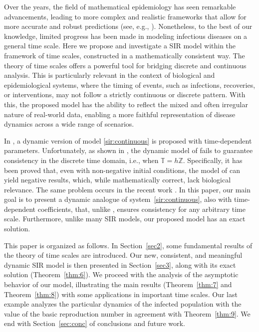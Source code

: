 \documentclass[pdflatex,sn-mathphys-num]{sn-jnl}
\theoremstyle{remark}
\begin{document}
Over the years, the field of mathematical epidemiology has seen remarkable advancements, leading 
to more complex and realistic frameworks that allow for more accurate and 
robust predictions (see, e.g., \cite{caetano, gai, lopez, influenza}). 
Nonetheless, to the best of our knowledge, limited progress has been made
in modeling infectious diseases on a general time scale. 
Here we propose and investigate a SIR model within the framework of time scales, 
constructed in a mathematically consistent way. The theory of time scales offers 
a powerful tool for bridging discrete and continuous analysis. This is particularly relevant 
in the context of biological and epidemiological systems, where the timing of events, 
such as infections, recoveries, or interventions, may not follow a strictly continuous 
or discrete pattern. With this, the proposed model has the ability to reflect the mixed 
and often irregular nature of real-world data, enabling a more faithful representation 
of disease dynamics across a wide range of scenarios. 

In \cite{sir:ts}, a dynamic version of model \eqref{sir:continuous} is proposed with 
time-dependent parameters. Unfortunately, as shown in \cite{sir:discrete}, 
the dynamic model of \cite{sir:ts} fails to guarantee consistency in 
the discrete time domain, i.e., when $\mathbb{T} = h\mathbb{Z}$. 
Specifically, it has been proved that, even with non-negative initial 
conditions, the model of \cite{sir:ts} can yield negative results, which, 
while mathematically correct, lack biological relevance. 
The same problem occurs in the recent work \cite{MyID:561}.
In this paper, our main goal is to present a dynamic analogue 
of system~\eqref{sir:continuous}, 
also with time-dependent coefficients, that, 
unlike \cite{MyID:561,sir:ts}, ensures 
consistency for any arbitrary time scale. 
Furthermore, unlike many SIR models, 
our proposed model has an exact solution. 

This paper is organized as follows. In Section~\ref{sec2}, some fundamental
results of the theory of time scales are introduced. Our new, consistent,
and meaningful dynamic SIR model is then presented in Section~\ref{sec3}, 
along with its exact solution (Theorem~\ref{thm:6}). We proceed with the 
analysis of the asymptotic behavior of our model, illustrating the main results 
(Theorem~\ref{thm:7} and Theorem~\ref{thm:8}) with some applications 
in important time scales. Our last example analyzes
the particular dynamics of the infected population with the value
of the basic reproduction number in agreement with Theorem~\ref{thm:9}. 
We end with Section~\ref{sec:conc} of conclusions and future work.
\end{document}
